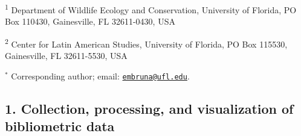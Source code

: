 \documentclass[
  12pt,
  man, donotrepeattitle,floatsintext]{apa6}
\begin{document}
\noindent \textsuperscript{1} Department of Wildlife Ecology and Conservation, University of Florida, PO Box 110430, Gainesville, FL 32611-0430, USA

\noindent \textsuperscript{2} Center for Latin American Studies, University of Florida, PO Box 115530, Gainesville, FL 32611-5530, USA

\bigskip

\noindent \(^\ast\) Corresponding author; email: \href{mailto:embruna@ufl.edu}{\nolinkurl{embruna@ufl.edu}}.

\newpage
\resetlinenumber
\linenumbers

\hypertarget{collection-processing-and-visualization-of-bibliometric-data}{%
\subsection{1. Collection, processing, and visualization of bibliometric data}\label{collection-processing-and-visualization-of-bibliometric-data}}
\end{document}
